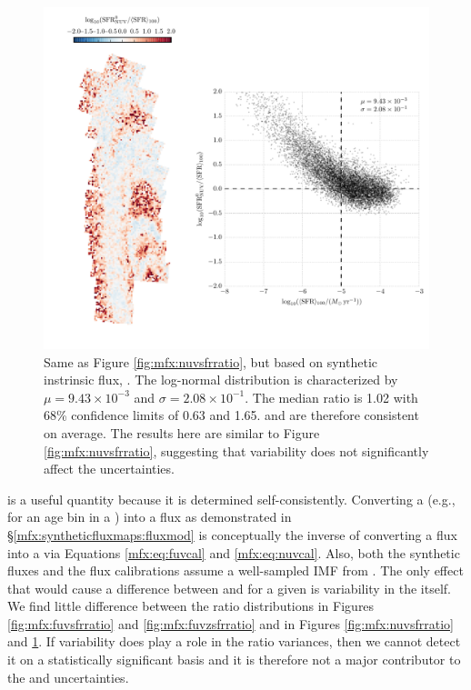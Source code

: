 \documentclass[iop, tighten]{emulateapj}
\begin{document}
\begin{figure}
\centering
\includegraphics[width=\textwidth]{m31flux-figures/sfr_nuv0-vs-mean.pdf}
\caption[Ratio of the \sfr{} based on the synthetic intrinsic \nuv{} flux to
the $100\myr$ mean \sfr{}.]{Same as Figure \ref{fig:mfx:nuvsfrratio}, but based
    on synthetic instrinsic flux, \sfrnuvz{}. The log-normal distribution is
    characterized by $\mu = 9.43\times 10^{-3}$ and $\sigma = 2.08\times
    10^{-1}$. The median ratio is 1.02 with 68\% confidence limits of 0.63 and
    1.65. \sfrnuvz{} and \sfroneh{} are therefore consistent on average. The
    results here are similar to Figure \ref{fig:mfx:nuvsfrratio}, suggesting
    that \sfh{} variability does not significantly affect the \sfrnuv{}
    uncertainties.
}
\label{fig:mfx:nuvzsfrratio}
\end{figure}


\sfrxz{} is a useful quantity because it is determined self-consistently.
Converting a \sfr{} (e.g., for an age bin in a \sfh{}) into a flux as
demonstrated in \S \ref{mfx:syntheticfluxmaps:fluxmod} is conceptually the
inverse of converting a flux into a \sfr{} via Equations \ref{mfx:eq:fuvcal}
and \ref{mfx:eq:nuvcal}. Also, both the synthetic fluxes and the flux
calibrations assume a well-sampled IMF from \citet{Kroupa:2001}. The only
effect that would cause a difference between \sfroneh{} and \sfrxz{} for a
given \sfh{} is variability in the \sfh{} itself. We find little difference
between the \sfr{} ratio distributions in Figures \ref{fig:mfx:fuvsfrratio} and
\ref{fig:mfx:fuvzsfrratio} and in Figures \ref{fig:mfx:nuvsfrratio} and
\ref{fig:mfx:nuvzsfrratio}. If \sfh{} variability does play a role in the
\sfr{} ratio variances, then we cannot detect it on a statistically significant
basis and it is therefore not a major contributor to the \sfrx{} and \sfrxz{}
uncertainties.
\end{document}
